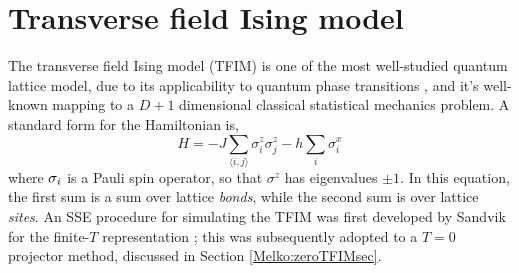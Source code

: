 \documentclass[vecphys]{svmult}
\begin{document}
\section{Transverse field Ising model} \label{Melko:TFIMSec}

The transverse field Ising model (TFIM) is one of the most well-studied quantum lattice model, due to its applicability to quantum phase transitions \cite{Melko:Sachdev11}, and it's well-known mapping to a $D+1$ dimensional classical statistical mechanics problem.  A standard form for the Hamiltonian is,
\begin{equation}
H = -J\sum_{\langle i,j \rangle} \sigma^z_i \sigma^z_j - h \sum_{i} \sigma^x_i
\end{equation}
where ${\bf \sigma}_i$ is a Pauli spin operator, so that $\sigma^z$ has eigenvalues $\pm 1$.  In this equation, the first sum is a sum over lattice {\em bonds}, while the second sum is over lattice {\em sites}.  An SSE procedure for simulating the TFIM was first developed by Sandvik for the finite-$T$ representation \cite{Melko:Sandvik03}; this was subsequently adopted to a $T=0$ projector method, discussed in Section \ref{Melko:zeroTFIMsec}.
\end{document}
